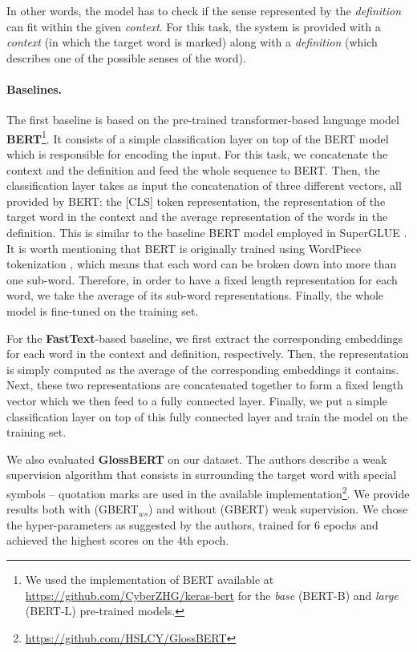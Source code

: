 \documentclass[11pt,a4paper]{article}
\begin{document}
In other words, the model has to check if the sense represented by the {\it definition} can fit within the given {\it context}.
For this task, the system is provided with a {\it context} (in which the target word is marked) along with a {\it definition} (which describes one of the possible senses of the word).

\paragraph{Baselines.}
The first baseline is based on the pre-trained transformer-based language model \textbf{BERT}\footnote{We used the implementation of BERT available at \url{https://github.com/CyberZHG/keras-bert} for the {\it base} (BERT-B) and {\it large} (BERT-L) pre-trained models.}. It consists of a simple classification layer on top of the BERT model which is responsible for encoding the input.
For this task, we concatenate the context and the definition and feed the whole sequence to BERT. Then, the classification layer takes as input the concatenation of three different vectors, all provided by BERT: the \textsc{[CLS]} token representation, the representation of the target word in the context and the average representation of the words in the definition. This is similar to the baseline BERT model employed in SuperGLUE \cite{wang2019superglue}. It is worth mentioning that BERT is originally trained using WordPiece tokenization \cite{wu2016google}, which means that each word can be broken down into more than one sub-word. Therefore, in order to have a fixed length representation for each word, we take the average of its sub-word representations. Finally, the whole model is fine-tuned on the training set.

For the \textbf{FastText}-based baseline, we first extract the corresponding embeddings for each word in the context and definition, respectively. Then, the representation is simply computed as the average of the corresponding embeddings it contains. Next, these two representations are concatenated together to form a fixed length vector which we then feed to a fully connected layer. Finally, we put a simple classification layer on top of this fully connected layer and train the model on the training set.

We also evaluated \textbf{GlossBERT} \cite{huang-etal-2019-glossbert} on our dataset.
The authors describe a weak supervision algorithm that consists in surrounding the target word with special symbols -- quotation marks are used in the available implementation\footnote{\url{https://github.com/HSLCY/GlossBERT}}. We provide results both with (GBERT$_{ws}$) and without (GBERT) weak supervision. We chose the hyper-parameters as suggested by the authors, trained for 6 epochs and achieved the highest scores on the 4th epoch.
\end{document}
